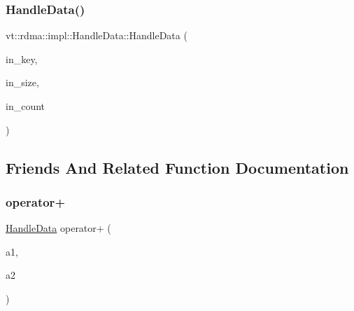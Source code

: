 \mbox{\label{structvt_1_1rdma_1_1impl_1_1_handle_data_ad824b76d3324b98059f8708d8e0823e4}} 
\subsubsection{\texorpdfstring{Handle\+Data()}{HandleData()}\hspace{0.1cm}{\footnotesize\ttfamily [2/2]}}
{\footnotesize\ttfamily vt\+::rdma\+::impl\+::\+Handle\+Data\+::\+Handle\+Data (\begin{DoxyParamCaption}\item[{\hyperlink{structvt_1_1rdma_1_1_handle_key}{Handle\+Key}}]{in\+\_\+key,  }\item[{std\+::size\+\_\+t}]{in\+\_\+size,  }\item[{int}]{in\+\_\+count }\end{DoxyParamCaption})\hspace{0.3cm}{\ttfamily [inline]}}



\subsection{Friends And Related Function Documentation}
\mbox{\label{structvt_1_1rdma_1_1impl_1_1_handle_data_a0db838048458aea13961a4e3494c6ddb}} 
\subsubsection{\texorpdfstring{operator+}{operator+}}
{\footnotesize\ttfamily \hyperlink{structvt_1_1rdma_1_1impl_1_1_handle_data}{Handle\+Data} operator+ (\begin{DoxyParamCaption}\item[{\hyperlink{structvt_1_1rdma_1_1impl_1_1_handle_data}{Handle\+Data}}]{a1,  }\item[{\hyperlink{structvt_1_1rdma_1_1impl_1_1_handle_data}{Handle\+Data} const \&}]{a2 }\end{DoxyParamCaption})\hspace{0.3cm}{\ttfamily [friend]}}



